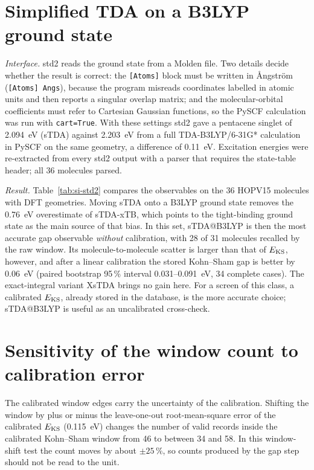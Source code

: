 \documentclass[11pt]{article}
\begin{document}
\section{Simplified TDA on a B3LYP ground state}\label{sec:std2}
\textit{Interface.} std2 reads the ground state from a Molden file. Two details decide whether the result is correct:
the \texttt{[Atoms]} block must be written in \AA ngstr\"om (\texttt{[Atoms] Angs}), because the program misreads
coordinates labelled in atomic units and then reports a singular overlap matrix; and the molecular-orbital coefficients
must refer to Cartesian Gaussian functions, so the PySCF calculation was run with \texttt{cart=True}. With these settings
std2 gave a pentacene singlet of \qty{2.094}{eV} (sTDA) against \qty{2.203}{eV} from a full TDA-B3LYP/6-31G* calculation
in PySCF on the same geometry, a difference of \qty{0.11}{eV}. Excitation energies were re-extracted from every std2 output with a parser that requires the state-table
header; all 36 molecules parsed.

\textit{Result.} Table~\ref{tab:si-std2} compares the observables on the 36 HOPV15 molecules with DFT geometries.
Moving sTDA onto a B3LYP ground state removes the \qty{0.76}{eV} overestimate of sTDA-xTB, which points to the
tight-binding ground state as the main source of that bias. In this set, sTDA@B3LYP is then the most accurate gap
observable \emph{without} calibration, with 28 of 31 molecules recalled by the raw window. Its molecule-to-molecule
scatter is larger than that of $E_{\mathrm{KS}}$, however, and after a linear calibration the stored Kohn--Sham gap is better by
\qty{0.06}{eV} (paired bootstrap 95\,\% interval 0.031--\qty{0.091}{eV}, 34 complete cases). The exact-integral variant
XsTDA brings no gain here. For a screen of this class, a calibrated $E_{\mathrm{KS}}$, already stored in the database, is the more
accurate choice; sTDA@B3LYP is useful as an uncalibrated cross-check.


\section{Sensitivity of the window count to calibration error}
The calibrated window edges carry the uncertainty of the calibration. Shifting the window by plus or minus the
leave-one-out root-mean-square error of the calibrated $E_{\mathrm{KS}}$ (\qty{0.115}{eV}) changes the number of valid records
inside the calibrated Kohn--Sham window from 46 to between 34 and 58. In this window-shift test the count moves by about
$\pm 25\,\%$, so counts produced by the gap step should not be read to the unit.
\end{document}
